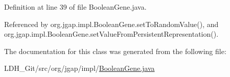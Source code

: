 Definition at line 39 of file Boolean\-Gene.\-java.



Referenced by org.\-jgap.\-impl.\-Boolean\-Gene.\-set\-To\-Random\-Value(), and org.\-jgap.\-impl.\-Boolean\-Gene.\-set\-Value\-From\-Persistent\-Representation().



The documentation for this class was generated from the following file\-:\begin{DoxyCompactItemize}
\item 
L\-D\-H\-\_\-\-Git/src/org/jgap/impl/\hyperlink{_boolean_gene_8java}{Boolean\-Gene.\-java}\end{DoxyCompactItemize}
